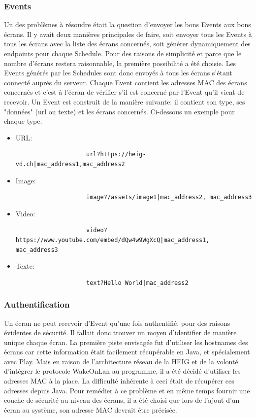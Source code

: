 \documentclass[french]{article}
\begin{document}
\subsubsection{Events}
Un des problèmes à résoudre était la question d'envoyer les bons Events aux bons écrans.
 Il y avait deux manières principales de faire, soit envoyer tous les Events à tous les écrans avec la liste des écrans concernés, soit générer dynamiquement des endpoints pour chaque Schedule. Pour des raisons de simplicité et parce que le nombre d'écrans restera raisonnable, la première possibilité a été choisie. \newline
Les Events générés par les Schedules sont donc envoyés à tous les écrans s'étant connecté auprès du serveur. Chaque Event contient les adresses MAC des écrans concernés et c'est à l'écran de vérifier s'il est concerné par l'Event qu'il vient de recevoir.\newline
Un Event est construit de la manière suivante: il contient son type, ses "données" (url ou texte) et les écrans concernés. Ci-dessous un exemple pour chaque type:
\begin{itemize}
	\item URL:\begin{verbatim}
					url?https://heig-vd.ch|mac_address1,mac_address2
			  \end{verbatim}
	\item Image: \begin{verbatim}
					image?/assets/image1|mac_address2, mac_address3
			  \end{verbatim}
	\item Video: \begin{verbatim}
					video?https://www.youtube.com/embed/dQw4w9WgXcQ|mac_address1, mac_address3
			  \end{verbatim}
	\item Texte: \begin{verbatim}
					text?Hello World|mac_address2
			  \end{verbatim}
\end{itemize}


\subsubsection{Authentification}
Un écran ne peut recevoir d'Event qu'une fois authentifié, pour des raisons évidentes de sécurité. Il fallait donc trouver un moyen d'identifier de manière unique chaque écran. La première piste envisagée fut d'utiliser les hostnames des écrans car cette information était facilement récupérable en Java, et spécialement avec Play. Mais en raison de l'architecture réseau de la HEIG et de la volonté d'intégrer le protocole WakeOnLan au programme, il a été décidé d'utiliser les adresses MAC à la place. \newline 
La difficulté inhérente à ceci était de récupérer ces adresses depuis Java. Pour remédier à ce problème et en même temps fournir une couche de sécurité au niveau des écrans, il a été choisi que lors de l'ajout d'un écran au système, son adresse MAC devrait être précisée. \newline
\end{document}
